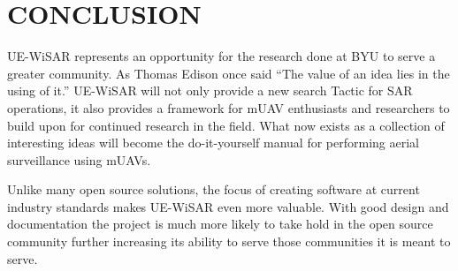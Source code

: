 \section{CONCLUSION}
UE-WiSAR represents an opportunity for the research done at BYU to serve a
greater community.  As Thomas Edison once said ``The value of an idea lies in
the using of it.''  UE-WiSAR will not only provide a new search Tactic for
SAR operations, it also provides a framework for mUAV enthusiasts and
researchers to build upon for continued research in the field.  What now exists
as a collection of interesting ideas will become the do-it-yourself manual for
performing aerial surveillance using mUAVs.  

Unlike many open source solutions, the focus of creating software at current
industry standards makes UE-WiSAR even more valuable.  With good design and
documentation the project is much more likely to take hold in the open source
community further increasing its ability to serve those communities it is meant
to serve.